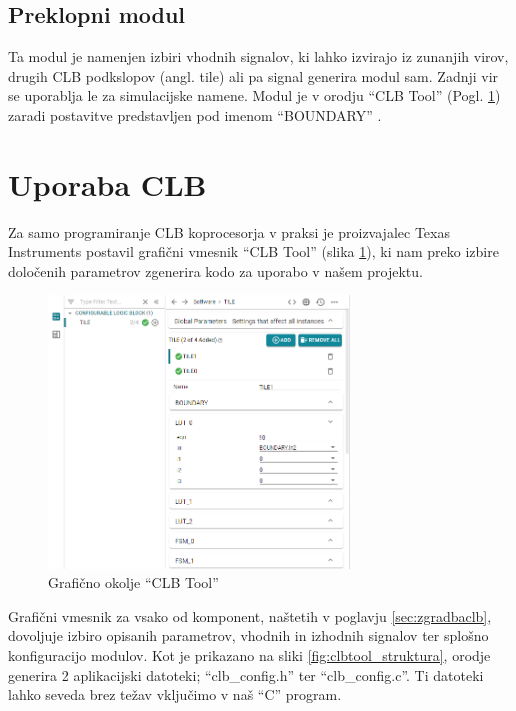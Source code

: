 \documentclass[a4paper]{article}
\begin{document}
\begin{sloppypar}
\subsection{Preklopni modul}
Ta modul je namenjen izbiri vhodnih signalov, ki lahko izvirajo iz zunanjih
virov, drugih CLB podkslopov (angl. tile) ali pa signal generira modul sam.
Zadnji vir se uporablja le za simulacijske namene. Modul je v orodju ``CLB
Tool'' (Pogl. \ref{sec:clb_tool}) zaradi postavitve predstavljen pod imenom
``BOUNDARY'' \cite[Pogl.~3.3]{clb-user-guide}.

\section{Uporaba CLB}\label{sec:clb_tool}
Za samo programiranje CLB koprocesorja v praksi je proizvajalec Texas
Instruments postavil grafični vmesnik ``CLB Tool'' (slika \ref{fig:clbtool}),
ki nam preko izbire določenih parametrov zgenerira kodo za uporabo v našem
projektu.

\begin{figure}[htb]
    \centerline{\includegraphics[width=8cm]{clbtool}}
    \caption{Grafično okolje ``CLB Tool''}
    \label{fig:clbtool} 
\end{figure} 

Grafični vmesnik za vsako od komponent, naštetih v poglavju
\ref{sec:zgradbaclb}, dovoljuje izbiro opisanih parametrov, vhodnih in izhodnih
signalov ter splošno konfiguracijo modulov. Kot je prikazano na sliki
\ref{fig:clbtool_struktura}, orodje generira 2 aplikacijski datoteki;
``clb\_config.h'' ter ``clb\_config.c''. Ti datoteki lahko seveda brez težav
vključimo v naš ``C'' program.


\end{sloppypar}
\end{document}
